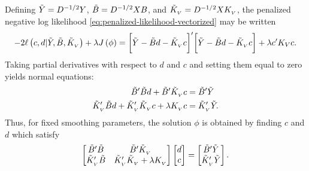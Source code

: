 Defining $\tilde{Y} = D^{-1/2} Y$, $\tilde{B} = D^{-1/2} X B $, and $\tilde{K}_{_{\scriptscriptstyle V}} = D^{-1/2} X K_{_{\scriptscriptstyle V}}$, the penalized negative log likelihood \eqref{eq:penalized-likelihood-vectorized} may be written
\begin{equation}\label{eq:penalized-loglik-tilde-vectorized}
-2\ell \left(c, d \vert \tilde{Y}, \tilde{B}, \tilde{K}_{_{\scriptscriptstyle V}} \right) + \lambda J\left( \phi \right) = \bigg[ \tilde{Y} - \tilde{B} d - \tilde{K}_{_{\scriptscriptstyle V}} c\bigg]'\bigg[ \tilde{Y} - \tilde{B} d - \tilde{K}_{_{\scriptscriptstyle V}} c\bigg] + \lambda c'K_Vc.
\end{equation}
\noindent
Taking partial derivatives with respect to $d$ and $c$ and setting them equal to zero yields normal equations: 
\begin{align}
\begin{split}
\tilde{B}'\tilde{B} d + \tilde{B}'\tilde{K}_{_{ V }} c &= \tilde{B}' \tilde{Y} \\
\tilde{K}_{_{\scriptscriptstyle V}}'\tilde{B} d + \tilde{K}_{_{\scriptscriptstyle V}}'\tilde{K}_{_{\scriptscriptstyle V}} c + \lambda K_{_{\scriptscriptstyle V}} c &= \tilde{K}_{_{\scriptscriptstyle V}}' \tilde{Y}.
\end{split}
\end{align}
\noindent
Thus, for fixed smoothing parameters, the solution $\phi$ is obtained by finding $c$ and $d$ which satisfy
\begin{equation} \label{eq:vectorized-normal-equations}
\begin{bmatrix}
\tilde{B}'\tilde{B} & \tilde{B}'\tilde{K}_{_{\scriptscriptstyle V}} \\
\tilde{K}_{_{\scriptscriptstyle V}}'\tilde{B} & \tilde{K}_{_{\scriptscriptstyle V}}'\tilde{K}_{_{\scriptscriptstyle V}} + \lambda K_{_{\scriptscriptstyle V}}\\
\end{bmatrix}
\begin{bmatrix}
d\\
c\\
\end{bmatrix}
= \begin{bmatrix}
\tilde{B}'\tilde{Y} \\
 \tilde{K}_{_{\scriptscriptstyle V}}'\tilde{Y}\\
\end{bmatrix}.
\end{equation}

